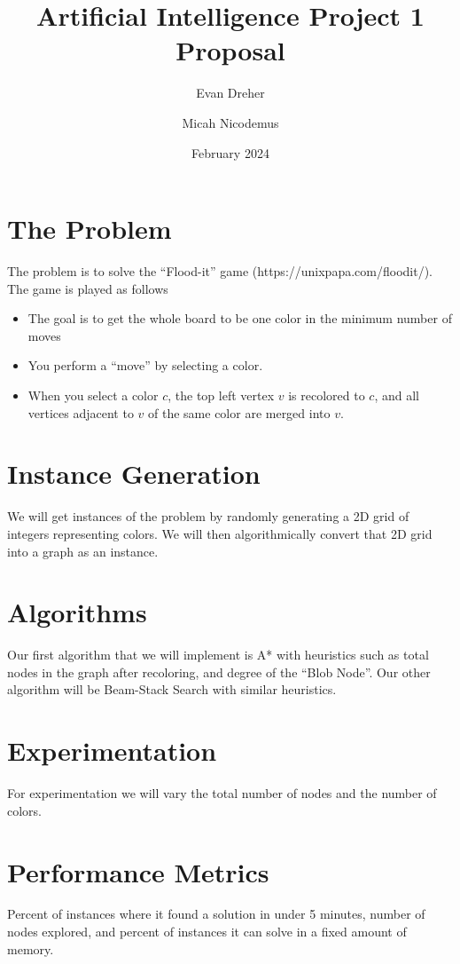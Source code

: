 \documentclass{article}
\author{
    Evan Dreher \\
    \and
    Micah Nicodemus
}
\title{Artificial Intelligence Project 1 Proposal}
\date{February 2024}
\begin{document}
\maketitle

\section{The Problem}
\par The problem is to solve the ``Flood-it'' game (https://unixpapa.com/floodit/). The game is played as follows
\begin{itemize}
    \item The goal is to get the whole board to be one color in the minimum number of moves
    \item You perform a ``move'' by selecting a color.
    \item When you select a color $c$, the top left vertex $v$ is recolored to $c$, and all vertices adjacent to $v$ of the same color are merged into $v$. 
\end{itemize}

\section{Instance Generation}
\par We will get instances of the problem by randomly generating a 2D grid of integers representing colors. We will then algorithmically convert that 2D grid into a graph as an instance.

\section{Algorithms}
\par Our first algorithm that we will implement is A* with heuristics such as total nodes in the graph after recoloring, and degree of the ``Blob Node''. Our other algorithm will be Beam-Stack Search with similar heuristics.

\section{Experimentation}
\par For experimentation we will vary the total number of nodes and the number of colors.

\section{Performance Metrics}
\par Percent of instances where it found a solution in under 5 minutes, number of nodes explored, and percent of instances it can solve in a fixed amount of memory.
\end{document}
